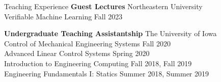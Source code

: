 \begin{rSection}{Teaching Experience}
    {\bf Guest Lectures} \hfill Northeastern University\\
    Verifiable Machine Learning \hfill Fall 2023

    {\bf Undergraduate Teaching Assistantship} \hfill The University of Iowa\\
    Control of Mechanical Engineering Systems \hfill Fall 2020\\
    Advanced Linear Control Systems \hfill Spring 2020\\
    Introduction to Engineering Computing \hfill Fall 2018, Fall 2019\\
    Engineering Fundamentals I: Statics \hfill Summer 2018, Summer 2019\\

\end{rSection}